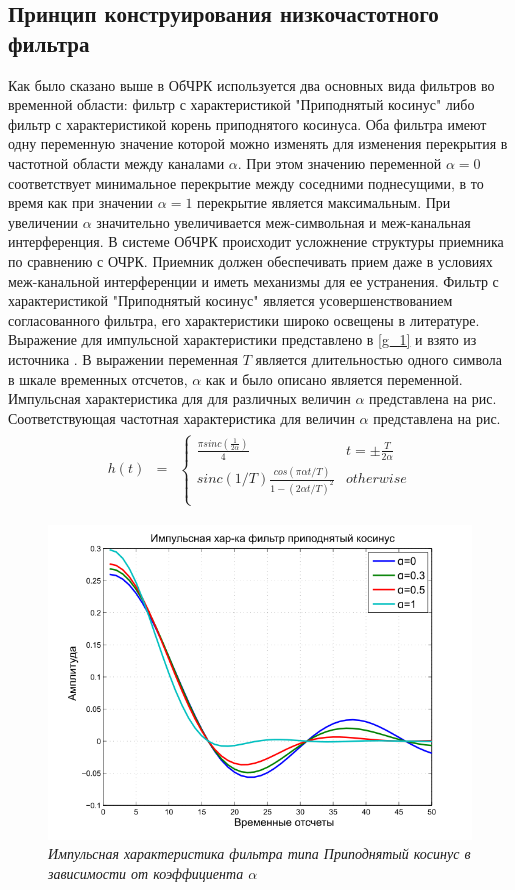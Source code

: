 \subsection{Принцип конструирования низкочастотного фильтра}
Как было сказано выше в ОбЧРК используется два основных вида фильтров во временной области: фильтр с характеристикой "Приподнятый косинус" либо фильтр с характеристикой корень приподнятого косинуса. Оба фильтра имеют одну переменную значение которой можно изменять для изменения перекрытия в частотной области между каналами $\alpha$. При этом значению переменной $\alpha=0$ соответствует минимальное перекрытие между соседними поднесущими, в то время как при значении $\alpha=1$ перекрытие является максимальным. При увеличении $\alpha$ значительно увеличивается меж-символьная и меж-канальная интерференция. В системе ОбЧРК происходит усложнение структуры приемника по сравнению с ОЧРК. Приемник должен обеспечивать прием даже в условиях меж-канальной интерференции и иметь механизмы для ее устранения.
Фильтр с характеристикой "Приподнятый косинус" является усовершенствованием согласованного фильтра, его характеристики широко освещены в литературе. Выражение для импульсной характеристики представлено в \eqref{g_1} и взято из источника \cite{Book17}. В выражении переменная $T$ является длительностью одного символа в шкале временных отсчетов, $\alpha$ как и было описано является переменной. Импульсная характеристика для для различных величин $\alpha$ представлена на рис. Соответствующая частотная характеристика для величин $\alpha$ представлена на рис. 
\begin{align}
\begin{matrix}
h(t)&=&\left\{
\begin{matrix}
\frac{\pi sinc(\frac{1}{2\alpha})}{4}& t=\pm \frac{T}{2\alpha}\\
sinc(1/T)\frac{cos(\pi \alpha t/T)}{1-(2 \alpha t /T)^2}&otherwise\\
\end{matrix} \right.
\end{matrix}
\label{g_1}
\end{align}
\begin{figure}[H]
\centering
\includegraphics[width=0.9\columnwidth]{RC_time.png}
\caption{\textit{Импульсная характеристика фильтра типа Приподнятый косинус в зависимости от коэффициента $\alpha$}}
\label{fg_1}
\end{figure}
